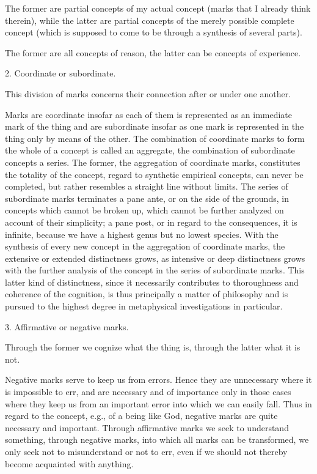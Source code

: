 The former are partial concepts of my actual concept
(marks that I already think therein),
while the latter are partial concepts of the merely possible complete concept
(which is supposed to come to be through a synthesis of several parts).

The former are all concepts of reason,
the latter can be concepts of experience.

2. Coordinate or subordinate.

This division of marks concerns their connection after or under one another.

Marks are coordinate insofar as each of them is
represented as an immediate mark of the thing
and are subordinate insofar as one mark is
represented in the thing only by means of the other.
The combination of coordinate marks to form
the whole of a concept is called an aggregate,
the combination of subordinate concepts a series.
The former, the aggregation of coordinate marks,
constitutes the totality of the concept,
regard to synthetic empirical concepts, can never be completed,
but rather resembles a straight line without limits.
The series of subordinate marks terminates a pane ante,
or on the side of the grounds, in concepts which cannot be broken up,
which cannot be further analyzed on account of their simplicity;
a pane post, or in regard to the consequences, it is infinite,
because we have a highest genus but no lowest species.
With the synthesis of every new concept in the aggregation of coordinate marks,
the extensive or extended distinctness grows,
as intensive or deep distinctness grows with the further
analysis of the concept in the series of subordinate marks.
This latter kind of distinctness, since it necessarily
contributes to thoroughness and coherence of the cognition,
is thus principally a matter of philosophy and is pursued
to the highest degree in metaphysical investigations in particular.

3. Affirmative or negative marks.

Through the former we cognize what the thing is,
through the latter what it is not.

Negative marks serve to keep us from errors.
Hence they are unnecessary where it is impossible to err,
and are necessary and of importance only in
those cases where they keep us from an important error
into which we can easily fall.
Thus in regard to the concept, e.g., of a being like God,
negative marks are quite necessary and important.
Through affirmative marks we seek to understand something,
through negative marks, into which all marks can be transformed,
we only seek not to misunderstand or not to err,
even if we should not thereby become acquainted with anything.


